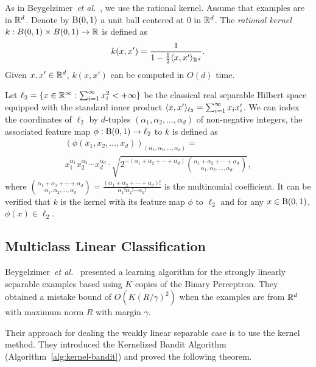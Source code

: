 As in Beygelzimer~{\em et al.}~\cite{BeygelzimerPSTWZ2019-separable}, we use the rational kernel.  Assume that examples are in ${\mathbb{R}}^d$.  Denote by ${\mathrm{B}}(0,1)$ a unit ball centered at $0$ in ${\mathbb{R}}^d$.
The {\em rational kernel} $k:B(0,1)\times B(0,1)\rightarrow{\mathbb{R}}$ is defined as
\[
k(x,x')=\frac{1}{1-\frac{1}{2}\langle x,x'\rangle_{{\mathbb{R}}^d}}.
\]
Given $x,x'\in{\mathbb{R}}^d$, $k(x,x')$ can be computed in $O(d)$ time.

Let $\ell_2=\{x\in{\mathbb{R}}^{\infty} : \sum_{i=1}^\infty x_i^2 < +\infty \}$ be the classical real separable Hilbert space equipped with the standard inner product $\langle x,x'\rangle_{\ell_2}=\sum_{i=1}^\infty x_i x'_i$.  We can index the coordinates of $\ell_2$ by $d$-tuples $(\alpha_1,\alpha_2,\ldots,\alpha_d)$ of non-negative integers, the associated feature map $\phi:{\mathrm{B}}(0,1)\rightarrow\ell_2$ to $k$ is defined as
\begin{multline}
\left(\phi(x_1,x_2,\ldots,x_d)\right)_{(\alpha_1,\alpha_2,\ldots,\alpha_d)} =
\\
x_1^{\alpha_1}x_2^{\alpha_2}\cdots x_d^{\alpha_d}
\cdot
\sqrt{2^{-(\alpha_1+\alpha_2+\cdots+\alpha_d)}{{\alpha_1+\alpha_2+\cdots+\alpha_d}\choose{\alpha_1,\alpha_2,\ldots,\alpha_d}}},
\label{eqn:phi}
\end{multline}
where
${{\alpha_1+\alpha_2+\cdots+\alpha_d}\choose{\alpha_1,\alpha_2,\ldots,\alpha_d}}
=
\frac{(\alpha_1+\alpha_2+\cdots+\alpha_d)!}{\alpha_1!\alpha_2!\cdots\alpha_d!}$
is the multinomial coefficient.  It can be verified that $k$ is the
kernel with its feature map $\phi$ to $\ell_2$ and for any
$x\in{\mathrm{B}}(0,1)$, $\phi(x)\in\ell_2$.

\subsection{Multiclass Linear Classification}

Beygelzimer~{\em et al.}~\cite{BeygelzimerPSTWZ2019-separable}
presented a learning algorithm for the strongly linearly separable
examples based using $K$ copies of the {\sc Binary Perceptron}.  They
obtained a mistake bound of $O(K(R/\gamma)^2)$ when the examples are
from ${\mathbb{R}}^d$ with maximum norm $R$ with margin $\gamma$.

Their approach for dealing the weakly linear separable case is to use
the kernel method.  They introduced the {\sc Kernelized Bandit
  Algorithm} (Algorithm~\ref{alg:kernel-bandit}) and proved the
following theorem.

